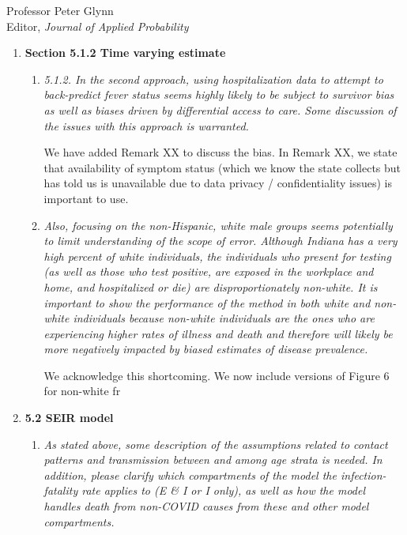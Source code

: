 \documentclass[11pt]{letter} %
\begin{document}
\begin{letter}{Professor
	Peter Glynn\\
	Editor, {\em Journal of Applied Probability}}
\begin{enumerate}
\begin{enumerate}
	Cite PNAS for measurement error and response rate cleaning.
	\vspace{5mm}
\end{enumerate}
\item {\bf Section 5.1.2 Time varying estimate}
\begin{enumerate}
	\item {\it 5.1.2. In the second approach, using hospitalization data to attempt to back-predict fever status seems highly likely to be subject to survivor bias as well as biases driven by differential access to care. Some discussion of the issues with this approach is warranted.}
	\vspace{5mm}

	We have added Remark XX to discuss the bias.  In Remark XX, we state that availability of symptom status (which we know the state collects but has told us is unavailable due to data privacy / confidentiality issues) is important to use.
	\vspace{5mm}
	\item {\it Also, focusing on the non-Hispanic, white male groups seems potentially to limit understanding of the scope of error. Although Indiana has a very high percent of white individuals, the individuals who present for testing (as well as those who test positive, are exposed in the workplace and home, and hospitalized or die) are disproportionately non-white. It is important to show the performance of the method in both white and non-white individuals because non-white individuals are the ones who are experiencing higher rates of illness and death and therefore will likely be more negatively impacted by biased estimates of disease prevalence.}
	\vspace{5mm}

	We acknowledge this shortcoming.  We now include versions of Figure 6 for non-white fr
	\vspace{5mm}
\end{enumerate}
\item {\bf 5.2 SEIR model}
\begin{enumerate}
	\item {\it As stated above, some description of the assumptions related to contact patterns and transmission between and among age strata is needed. In addition, please clarify which compartments of the model the infection-fatality rate applies to (E \& I or I only), as well as how the model handles death from non-COVID causes from these and other model compartments.}
	\vspace{5mm}


\end{enumerate}
\end{enumerate}
\end{letter}
\end{document}

